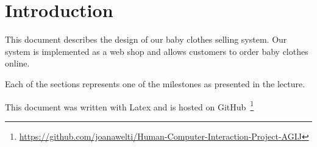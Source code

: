 \section{Introduction}
This document describes the design of our baby clothes selling system. Our system is implemented as a web shop and allows customers to order baby clothes online. 

Each of the sections represents one of the milestones as presented in the lecture.

This document was written with Latex and is hosted on GitHub~\footnote{\url{https://github.com/joanawelti/Human-Computer-Interaction-Project-AGIJ}}